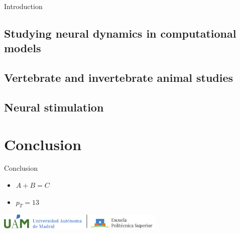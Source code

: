 \documentclass[aspectratio=43]{beamer}
\begin{document}
\begin{frame}{Introduction}
	\subsection{Studying neural dynamics in computational models}
	\subsection{Vertebrate and invertebrate animal studies}
	\subsection{Neural stimulation}
\end{frame}


\section{Conclusion}

    \begin{frame}{Conclusion}
    
    \begin{itemize}
        \item $A+B=C$
        \item $p_T=13$
    \end{itemize}
    \end{frame}
\begin{frame}[plain,t]
\vspace{100pt}
\centering
\includegraphics[width=0.6\textwidth]{logos/UAM+EPS_L-eps-converted-to.pdf}
\end{frame}
\end{document}
